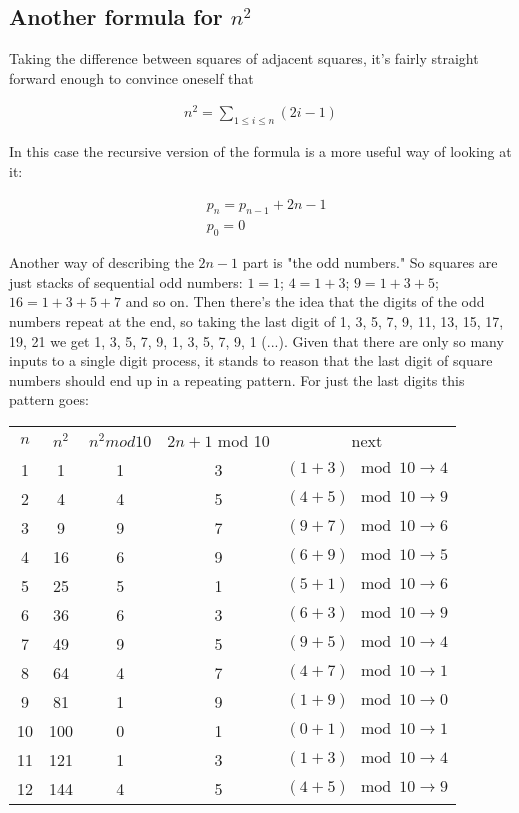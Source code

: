 \subsection{Another formula for $n^2$}

Taking the difference between squares of adjacent squares, it's fairly straight forward enough to convince
oneself that

\begin{align*}
     n^2 = \sum_{1 \leq i \leq n} (2i - 1)
\end{align*}

In this case the recursive version of the formula is a more useful way of looking at it:

\begin{align*}
     &p_n = p_{n - 1} + 2n - 1 \\
     &p_0 = 0
\end{align*}

Another way of describing the $2n - 1$ part is "the odd numbers."  So squares are just stacks of sequential odd numbers:
$1 = 1$; $4 = 1 + 3$; $9 = 1 + 3 + 5$; $16 = 1 + 3 + 5 + 7$ and so on.  Then there's the idea that the digits of the odd
numbers repeat at the end, so taking the last digit of 1, 3, 5, 7, 9, 11, 13, 15, 17, 19, 21 we get 1, 3, 5, 7, 9,
1, 3, 5, 7, 9, 1 (...).  Given that there are only so many inputs to a single digit process, it stands to reason that the
last digit of square numbers should end up in a repeating pattern.  For just the last digits this pattern goes:

\begin{center}
\begin{tabular}{ c c c c c }
$n$ & $n^2$ & $n^2 mod 10$ & $2n + 1$ mod 10 & next \\ 
1 & 1 & 1 & 3 & $(1 + 3) \mod 10 \rightarrow 4$ \\  
2 & 4 & 4 & 5 & $(4 + 5) \mod 10 \rightarrow 9$ \\
3 & 9 & 9 & 7 & $(9 + 7) \mod 10 \rightarrow 6$ \\
4 & 16 & 6 & 9 & $(6 + 9) \mod 10 \rightarrow 5$ \\
5 & 25 & 5 & 1 & $(5 + 1) \mod 10 \rightarrow 6$ \\
6 & 36 & 6 & 3 & $(6 + 3) \mod 10 \rightarrow 9$ \\
7 & 49 & 9 & 5 & $(9 + 5) \mod 10 \rightarrow 4$ \\
8 & 64 & 4 & 7 & $(4 + 7) \mod 10 \rightarrow 1$ \\
9 & 81 & 1 & 9 & $(1 + 9) \mod 10 \rightarrow 0$ \\
10 & 100 & 0 & 1 & $(0 + 1) \mod 10 \rightarrow 1$ \\
11 & 121 & 1 & 3 & $(1 + 3) \mod 10 \rightarrow 4$ \\
12 & 144 & 4 & 5 & $(4 + 5) \mod 10 \rightarrow 9$  
\end{tabular}
\end{center}

